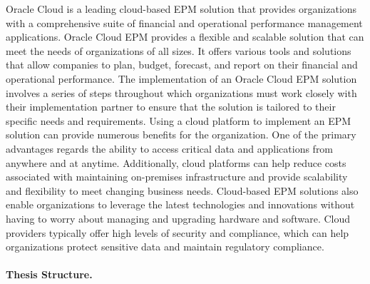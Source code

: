 \documentclass[12pt,a4paper,openright,twoside]{book}
\begin{document}
Oracle Cloud is a leading cloud-based EPM solution that provides organizations with a comprehensive suite of financial and operational performance management applications.
%
Oracle Cloud EPM provides a flexible and scalable solution that can meet the needs of organizations of all sizes.
%
It offers various tools and solutions that allow companies to plan, budget, forecast, and report on their financial and operational performance.
%
The implementation of an Oracle Cloud EPM solution involves a series of steps throughout which organizations must work closely with their implementation partner to ensure that the solution is tailored to their specific needs and requirements.
%
Using a cloud platform to implement an EPM solution can provide numerous benefits for the organization. 
%
One of the primary advantages regards the ability to access critical data and applications from anywhere and at anytime.
%
Additionally, cloud platforms can help reduce costs associated with maintaining on-premises infrastructure and provide scalability and flexibility to meet changing business needs. 
%
Cloud-based EPM solutions also enable organizations to leverage the latest technologies and innovations without having to worry about managing and upgrading hardware and software. 
%
Cloud providers typically offer high levels of security and compliance, which can help organizations protect sensitive data and maintain regulatory compliance. 

\newpage

\paragraph{Thesis Structure.}
%
\end{document}
